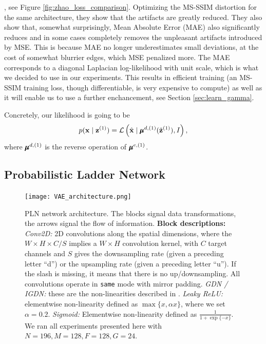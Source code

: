 \cite{zhao2015loss}, see Figure \ref{fig:zhao_loss_comparison}. Optimizing the
MS-SSIM distortion for the same architecture, they show that the artifacts are
greatly reduced. They also show that, somewhat surprisingly, Mean Absolute Error
(MAE) also significantly reduces and in some cases completely removes the
unpleasant artifacts introduced by MSE.
This is because MAE no longer underestimates small deviations, at the cost of
somewhat blurrier edges, which MSE penalized more. The MAE corresponds to a
diagonal Laplacian log-likelihood with unit scale, which is what we decided to
use in our experiments. This results in efficient training (an MS-SSIM
training loss, though differentiable, is very expensive to compute) as well as
it will enable us to use a further enchancement, see Section
\ref{sec:learn_gamma}.

Concretely, our likelihood is going to be
\begin{equation}
\label{eq:laplace_likelihood}
  p(\mathbf{x} \mid \mathbf{z}^{(1)}) = \mathcal{L}\left( \hat{\mathbf{x}} \mid
  \pmb{\mu}^{d, (1)}(\tilde{\mathbf{z}}^{(1)}), I \right),
\end{equation}
where $\pmb{\mu}^{d, (1)}$ is the reverse operation of $\pmb{\mu}^{e, (1)}$.


\subsection{Probabilistic Ladder Network}
\label{sec:prob_ladder_networks}

\begin{figure}
  \centering
  \texttt{[image: VAE\_architecture.png]}
  \caption{PLN network architecture. The blocks signal data transformations, the
    arrows signal the flow of information. \textbf{Block descriptions:}
    \textit{Conv2D:} 2D convolutions along the spatial dimensions, where the
    $W\times H \times C / S$ implies a $W \times H$ convolution kernel, with $C$
  target channels and $S$ gives the downsampling rate (given a preceding letter
  ``d'') or the upsampling rate (given a preceding letter ``u''). If the slash
  is missing, it means that there is no up/downsampling. All convolutions operate
  in \texttt{same} mode with mirror padding. \textit{GDN / IGDN:} these are the
  non-linearities described in \cite{balle2016end}. \textit{Leaky ReLU:}
  elementwise non-linearity defined as $\max\{x, \alpha x\}$, where we set
  $\alpha=0.2$. \textit{Sigmoid:} Elementwise non-linearity defined as
  $\frac{1}{1 + \exp\{-x\}}$. We ran all
  experiments presented here with $N = 196, M = 128, F = 128, G = 24$.}
  \label{fig:pln_architecture}
\end{figure}

